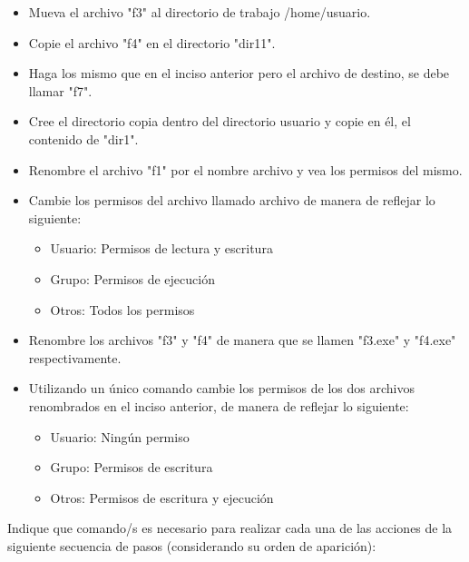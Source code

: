 \begin{questions}
\begin{itemize}
	\item Mueva el archivo "f3" al directorio de trabajo /home/usuario.
	\item Copie el archivo "f4" en el directorio "dir11".
	\item Haga los mismo que en el inciso anterior pero el archivo de destino, se debe llamar "f7".
	\item Cree el directorio copia dentro del directorio usuario y copie en él, el contenido de "dir1".
	\item Renombre el archivo "f1" por el nombre archivo y vea los permisos del mismo.
	\item Cambie los permisos del archivo llamado archivo de manera de reflejar lo siguiente:
	\begin{itemize}
		\item Usuario: Permisos de lectura y escritura
		\item Grupo: Permisos de ejecución
		\item Otros: Todos los permisos
	\end{itemize}
	\item Renombre los archivos "f3" y "f4" de manera que se llamen "f3.exe" y "f4.exe" respectivamente.
	\item	Utilizando un único comando cambie los permisos de los dos archivos renombrados en el inciso anterior, de manera de reflejar lo siguiente:
	\begin{itemize}
		\item Usuario: Ningún permiso
		\item Grupo: Permisos de escritura
		\item Otros: Permisos de escritura y ejecución
	\end{itemize}
\end{itemize}

\question Indique que comando/s es necesario para realizar cada una de las acciones de la siguiente secuencia de pasos (considerando su orden de aparición):
\end{questions}

